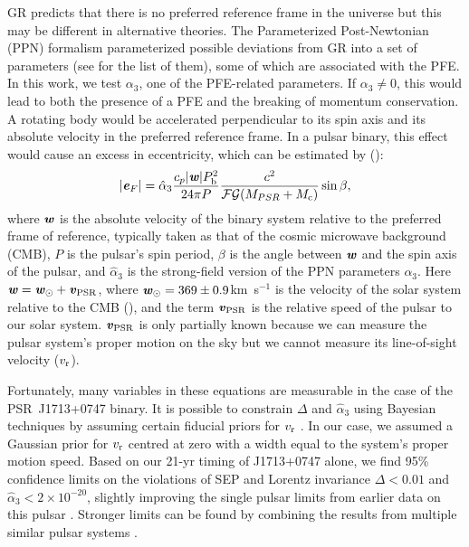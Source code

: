 GR predicts that there is no preferred reference frame in the universe but this may
be different in alternative theories. 
The Parameterized Post-Newtonian (PPN) formalism parameterized possible
deviations from GR into a set of parameters (see
\citealt{will14} for the list of them), some of which are associated with the
PFE. In this work, we test $\alpha_3$, one of the PFE-related parameters. 
If $\alpha_3 \neq 0$, this would lead to both
the presence of a PFE and the breaking of momentum conservation.
A rotating body would be accelerated perpendicular to its spin
axis and its absolute velocity in the preferred reference frame.
In a pulsar binary, this effect would cause an excess in eccentricity, which can be estimated by (\citealt{de92, bd96}):
\begin{equation}
|\textbf{\textit{e}}_F| = \hat{\alpha}_3 \frac{c_p|\textbf{\textit{w}}|P_{\rm b}^2}{24\pi P}
\frac{c^2}{\msF\msG (M_{PSR}+M_{\rm c})}\sin \beta,
\end{equation}
where $\textbf{\textit{w}}$ is the absolute velocity of the binary system
relative to the preferred frame of reference, typically taken as that of the cosmic microwave background (CMB), $P$ is the pulsar's spin period, $\beta$ is the
angle between $\textbf{\textit{w}}$ and the spin axis of the pulsar, and
$\hat{\alpha}_3$ is the strong-field version of the PPN parameters $\alpha_3$.
Here $\textbf{\textit{w}} = \textbf{\textit{w}}_{\odot} + \textbf{\textit{v}}_{\rm PSR}$, where
$\textbf{\textit{w}}_{\odot}=369\pm0.9$km~s$^{-1}$ is the velocity of
the solar system relative to the CMB (\citealt{hwh+09}),
and the term $\textbf{\textit{v}}_{\rm PSR}$ is the relative speed of the pulsar to our solar system. 
$\textbf{\textit{v}}_{\rm PSR}$ is only partially known because we can measure
the pulsar system's proper motion on the sky but we cannot measure its
line-of-sight velocity ($v_{\rm r}$).

Fortunately, many variables in these equations are measurable in the
case of the PSR~J1713+0747 binary. 
It is possible to constrain $\Delta$ and $\hat{\alpha}_3$ using Bayesian techniques 
by assuming certain fiducial priors for $v_{\rm r}$ \citep{sns+05, sfl+05, gsf+11}. 
In our case, we assumed a Gaussian prior for $v_{\rm r}$ centred at zero with
a width equal to the system's proper motion speed.
Based on our 21-yr 
timing of J1713+0747 alone, we find 95\% confidence limits on the violations of SEP and
Lorentz invariance $\Delta < 0.01$ and $\hat{\alpha}_3<2\times10^{-20}$, 
slightly improving the single pulsar limits from earlier data on this pulsar
\citep{sns+05, sfl+05, gsf+11}.
Stronger limits can be found by combining the results from
multiple similar pulsar systems \citep{wex00,sfl+05, gsf+11}.

